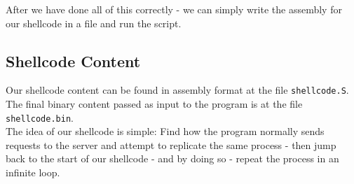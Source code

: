 \documentclass{article}
\begin{document}
After we have done all of this correctly - we can simply write
the assembly for our shellcode in a file and run the script.\\

\subsection{Shellcode Content}
Our shellcode content can be found
in assembly format at the file \texttt{shellcode.S}.\\
The final binary content passed as input to the program is at the file \texttt{shellcode.bin}.\\

The idea of our shellcode is simple: Find how the program
normally sends requests to the server and attempt to replicate the same process
- then jump back to the start of our shellcode - and by doing so -
repeat the process in an infinite loop.\\
\end{document}
